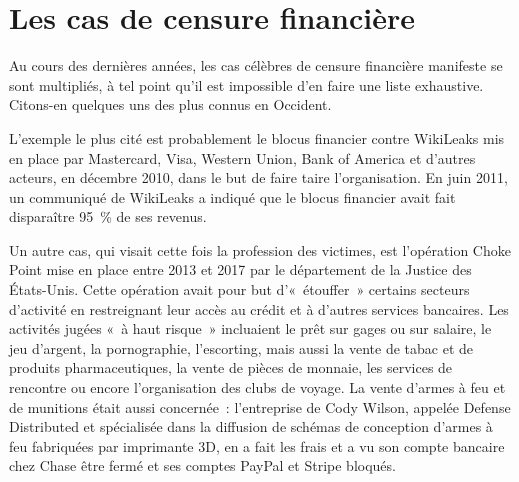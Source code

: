 \section*{Les cas de censure financière}


Au cours des dernières années, les cas célèbres de censure financière manifeste se sont multipliés, à tel point qu'il est impossible d'en faire une liste exhaustive. Citons-en quelques uns des plus connus en Occident.


L'exemple le plus cité est probablement le blocus financier contre WikiLeaks mis en place par Mastercard, Visa, Western Union, Bank of America et d'autres acteurs, en décembre 2010, dans le but de faire taire l'organisation. En juin 2011, un communiqué de WikiLeaks a indiqué que le blocus financier avait fait disparaître 95~\% de ses revenus.

Un autre cas, qui visait cette fois la profession des victimes, est l'opération Choke Point mise en place entre 2013 et 2017 par le département de la Justice des États-Unis. Cette opération avait pour but d'«~étouffer~» certains secteurs d'activité en restreignant leur accès au crédit et à d'autres services bancaires. Les activités jugées «~à haut risque~» incluaient le prêt sur gages ou sur salaire, le jeu d'argent, la pornographie, l'escorting, mais aussi la vente de tabac et de produits pharmaceutiques, la vente de pièces de monnaie, les services de rencontre ou encore l'organisation des clubs de voyage. La vente d'armes à feu et de munitions était aussi concernée~: l'entreprise de Cody Wilson, appelée Defense Distributed et spécialisée dans la diffusion de schémas de conception d'armes à feu fabriquées par imprimante 3D, en a fait les frais et a vu son compte bancaire chez Chase être fermé et ses comptes PayPal et Stripe bloqués.

